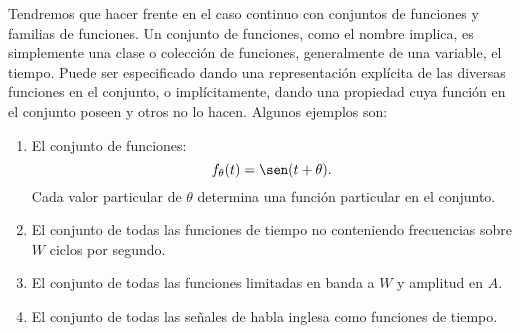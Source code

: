 Tendremos que hacer frente en el caso continuo con conjuntos de
funciones y familias de funciones. Un conjunto de funciones, como el
nombre implica, es simplemente una clase o colecci\'on de funciones,
generalmente de una variable, el tiempo. Puede ser especificado dando
una representaci\'on expl\'icita de las diversas funciones en el
conjunto, o impl\'icitamente, dando una propiedad cuya funci\'on en el
conjunto poseen y otros no lo hacen. Algunos ejemplos son:
\begin{enumerate}
  \item El conjunto de funciones:
  \begin{equation}
    f_{\theta}(t) = \sen(t+\theta).
  \end{equation}
  Cada valor particular de $\theta$ determina una funci\'on particular en el
  conjunto.

  \item El conjunto de todas las funciones de tiempo no conteniendo frecuencias
  sobre $W$ ciclos por segundo.

  \item El conjunto de todas las funciones limitadas en banda a $W$ y amplitud
  en $A$.

  \item El conjunto de todas las se\~nales de habla inglesa como funciones de
  tiempo.
\end{enumerate}


